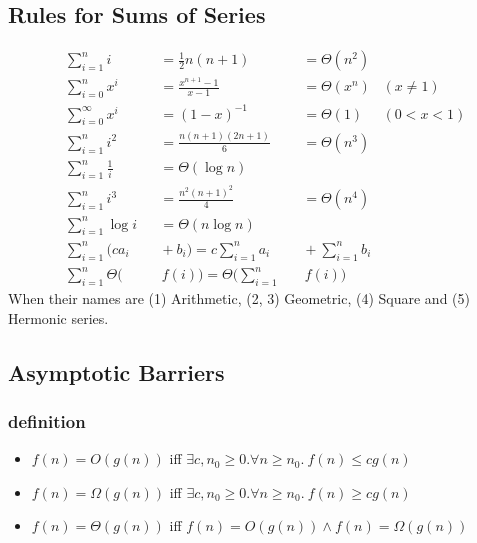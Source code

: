 \documentclass[]{article}
\newcommand\logn  {\log n}
\begin{document}
\begin{multicols}{2}
		\subsection{Rules for Sums of Series}
		\begin{alignat}{9}
			&\sum_{i = 1}^n i &&= \tfrac{1}{2}n(n + 1) &&= \Theta(n^2) \\
			&\sum_{i = 0}^{n} x^i &&= \tfrac{x^{n + 1} - 1}{x - 1} &&= \Theta(x^n)  &(x \neq 1) \\
			&\sum_{i = 0}^{\infty} x^i&&= (1 - x)^{-1} &&= \Theta(1) &(0 < x < 1) \\
			&\sum_{i = 1}^{n} i^2 &&= \tfrac{n(n + 1)(2n + 1)}{6} &&= \Theta(n^3) \\
			&\sum_{i = 1}^{n} \tfrac{1}{i} &&= \Theta(\logn) \\
			&\sum_{i = 1}^{n} i^3 &&= \tfrac{n^2(n + 1)^2}{4} &&= \Theta(n^4) \\
			&\sum_{i = 1}^{n}  \log i &&= \Theta(n\log n) \\
			&\sum_{i = 1}^n (ca_i &&\!\!+ b_i) = c \sum_{i = 1}^{n} a_i &&\!\!+ \sum_{i = 1}^{n}b_i \\
			&\sum_{i = 1}^{n} \Theta \big(&&\!\!\!\!\, f(i)\big) = \Theta \Bigg (\sum_{i = 1}^{n} &&\!\!\!\, f(i) \Bigg)
		\end{alignat}
		When their names are (1) Arithmetic, (2, 3) Geometric, (4) Square and (5) Hermonic series.
		
		\subsection{Asymptotic Barriers}
		\subsubsection{definition}
		\begin{itemize}
			\item $ f(n) = O(g(n)) $ iff $ \exists c, n_0 \ge 0. \forall n \ge n_0. \ f(n) \le c g(n) $
			\item $ f(n) = \Omega(g(n)) $ iff $ \exists c, n_0 \ge 0. \forall n \ge n_0. \ f(n) \ge c g(n) $
			\item $ f(n) = \Theta(g(n)) $ iff $ f(n) = O(g(n)) \land f(n) = \Omega(g(n)) $
		\end{itemize}
		

\end{multicols}
\end{document}
